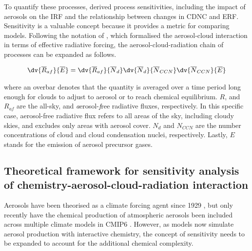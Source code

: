 To quantify these processes, \citet{ghanChallengesConstrainingAnthropogenic2016} derived process sensitivities, including the impact of aerosols on the IRF and the relationship between changes in CDNC and ERF. Sensitivity is a valuable concept because it provides a metric for comparing models. Following the notation of \citet{ghanChallengesConstrainingAnthropogenic2016}, which formalised the aerosol-cloud interaction in terms of effective radiative forcing, the aerosol-cloud-radiation chain of processes can be expanded as follows.

\begin{equation} \label{ch5:eq:ghan2016}
    \begin{aligned}
        \dv{\overline{R}_{af}}{\overline{E}} = 
        \dv{\overline{R}_{af}}{\overline{N}_d}
        \dv{\overline{N}_d}{\overline{N}_{CCN}}
        \dv{\overline{N}_{CCN}}{\overline{E}}
    \end{aligned}
\end{equation}

where an overbar denotes that the quantity is averaged over a time period long enough for clouds to adjust to aerosol or to reach chemical equilibrium. $R$, and $R_{af}$ are the all-sky, and \textit{a}erosol-\textit{f}ree radiative fluxes, respectively. In this specific case, aerosol-free radiative flux refers to all areas of the sky, including cloudy skies, and excludes only areas with aerosol cover. $N_d$ and $N_{CCN}$ are the number concentrations of cloud and cloud condensation nuclei, respectively. Lastly, $E$ stands for the emission of aerosol precursor gases.


\subsection{Theoretical framework for sensitivity analysis of chemistry-aerosol-cloud-radiation interaction}

Aerosols have been theorised as a climate forcing agent since 1929 \citep{angstromAtmosphericTransmissionSun1929}, but only recently have the chemical production of atmospheric aerosols been included across multiple climate models in CMIP6 \citep[e.g.][]{collinsAerChemMIPQuantifyingEffects2017, kalisorasDecomposingEffectiveRadiative2024}. However, as models now simulate aerosol production with interactive chemistry, the concept of sensitivity needs to be expanded to account for the additional chemical complexity.

